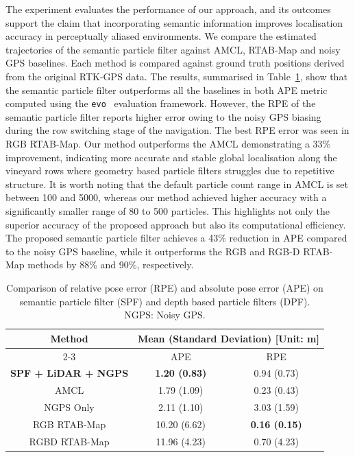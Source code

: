 \documentclass[letterpaper, 10 pt, conference]{ieeeconf}
\begin{document}
The experiment evaluates the performance of our approach, and its outcomes support the claim that incorporating semantic information improves localisation accuracy in perceptually aliased environments. We compare the estimated trajectories of the semantic particle filter against AMCL, RTAB-Map and noisy GPS baselines. Each method is compared against ground truth positions derived from the original RTK-GPS data. The results, summarised in Table~\ref{tab:evo}, show that the semantic particle filter outperforms all the baselines in both APE metric computed using the \texttt{evo}~\cite{evo} evaluation framework. However, the RPE of the semantic particle filter reports higher error owing to the noisy GPS biasing during the row switching stage of the navigation. The best RPE error was seen in RGB RTAB-Map. Our method outperforms the AMCL demonstrating a 33\% improvement, indicating more accurate and stable global localisation along the vineyard rows where geometry based particle filters struggles due to repetitive structure. It is worth noting that the default particle count range in AMCL is set between 100 and 5000, whereas our method achieved higher accuracy with a significantly smaller range of 80 to 500 particles. This highlights not only the superior accuracy of the proposed approach but also its computational efficiency. The proposed semantic particle filter achieves a 43\% reduction in APE compared to the noisy GPS baseline, while it outperforms the RGB and RGB-D RTAB-Map methods by 88\% and 90\%, respectively.

\begin{table}[t]
  \centering
  \caption{Comparison of relative pose error (RPE) and absolute pose error (APE) on semantic particle filter (SPF) and depth based particle filters (DPF). NGPS: Noisy GPS.}
  \begin{tabular}{ccc}
    \toprule
    \multirow{2}{*}{\textbf{Method}} & \multicolumn{2}{c}{\textbf{Mean (Standard Deviation) [Unit: m]}}\\
    \cmidrule(lr){2-3}
    & APE & RPE \\
    \midrule
    \textbf{SPF + LiDAR + NGPS} & \textbf{1.20 (0.83)} & 0.94 (0.73)\\
    AMCL & 1.79 (1.09) & 0.23 (0.43)\\
    NGPS Only & 2.11 (1.10) & 3.03 (1.59)\\
    RGB RTAB-Map & 10.20 (6.62) & \textbf{0.16 (0.15)}\\
    RGBD RTAB-Map & 11.96 (4.23) & 0.70 (4.23)\\ 
    \bottomrule
  \end{tabular}
  \label{tab:evo}
\end{table}
\end{document}
